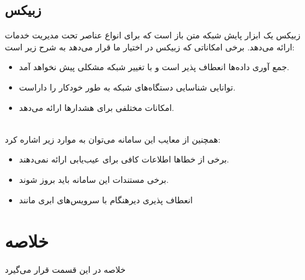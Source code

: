 \newpage


\subsection{زبیکس}

زبیکس یک ابزار پایش شبکه متن باز است که برای انواع عناصر تحت مدیریت خدمات ارائه می‌دهد. برخی امکاناتی که زبیکس در اختیار ما قرار می‌دهد به شرح زیر است\cite{olups2010zabbix}:

\begin{itemize}
    \item جمع آوری داده‌ها انعطاف پذیر است و با تغییر شبکه مشکلی پیش نخواهد آمد.
    \item توانایی شناسایی دستگاه‌های شبکه به طور خودکار را داراست.
    \item امکانات مختلفی برای هشدارها ارائه می‌دهد.
\end{itemize}
\\
همچنین از معایب این سامانه می‌توان به موارد زیر اشاره کرد:

\begin{itemize}
    \item برخی از خطاها اطلاعات کافی برای عیب‌یابی ارائه نمی‌دهند.
    \item برخی مستندات این سامانه باید بروز شوند.
    \item انعطاف پذیری دیرهنگام با سرویس‌های ابری مانند 
\end{itemize}


\newpage

\section{خلاصه}

خلاصه در این قسمت قرار می‌گیرد

